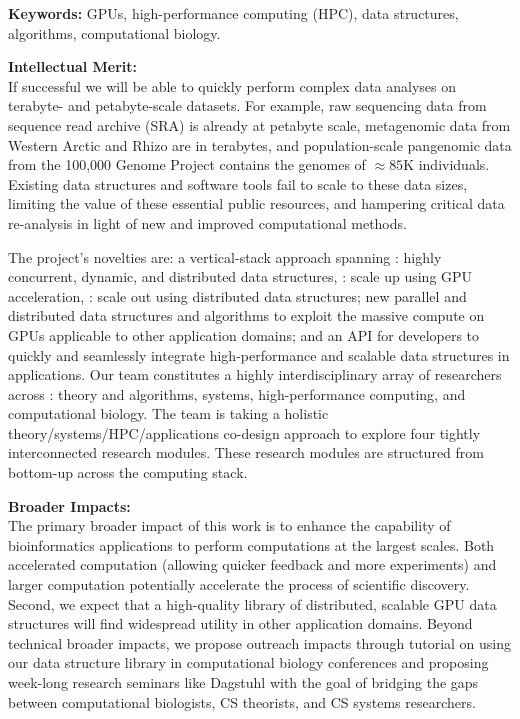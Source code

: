 \noindent \textbf{\large Keywords:} GPUs, high-performance computing (HPC), data structures, algorithms,   computational biology.

\noindent \textbf{\large Intellectual Merit:}\\
If successful we will be able to quickly perform complex data analyses on terabyte- and petabyte-scale datasets. For example, raw sequencing data from sequence read archive (SRA) is already at petabyte scale, metagenomic data from Western Arctic and Rhizo are in terabytes, and population-scale pangenomic data from the 100,000 Genome Project contains the genomes of $\approx85$K individuals. Existing data structures and software tools fail to scale to these data sizes, limiting the value of these essential public resources, and hampering critical data re-analysis in light of new and improved computational methods.

The project’s novelties are: a vertical-stack approach spanning : highly concurrent, dynamic, and distributed data structures,
: scale up using GPU acceleration, : scale out using distributed data structures; new parallel and
distributed data structures and algorithms to exploit the massive compute on
GPUs applicable to other application domains; and an API for developers to
quickly and seamlessly integrate high-performance and scalable data structures
in applications.
%
Our team constitutes a highly interdisciplinary array of researchers across : theory and algorithms, systems, high-performance computing, and computational biology. The team is taking a holistic theory/systems/HPC/applications co-design approach to explore four tightly interconnected research modules. These research modules are structured from bottom-up across the computing stack.


\noindent \textbf{\large Broader Impacts: }\\
The primary broader impact of this work is to enhance the capability of
bioinformatics applications to perform computations at the largest scales. Both
accelerated computation (allowing quicker feedback and more experiments) and
larger computation potentially accelerate the process of scientific discovery.
Second, we expect that a high-quality library of distributed, scalable GPU data
structures will find widespread utility in other application domains.
%
Beyond technical broader impacts, we propose outreach impacts through tutorial
on using our data structure library in computational biology conferences and
proposing week-long research seminars like Dagstuhl with the goal of bridging
the gaps between computational biologists, CS theorists, and CS systems
researchers. 
